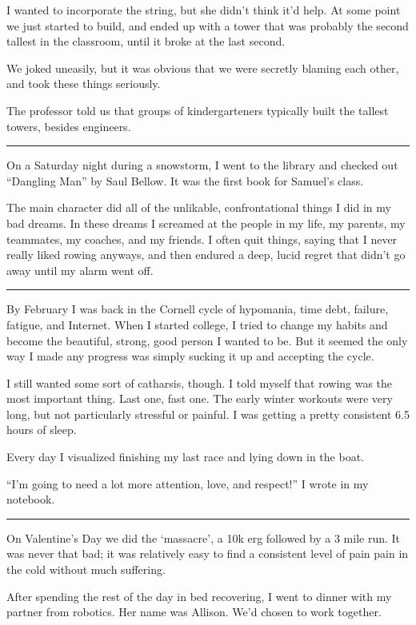 I wanted to incorporate the string, but she didn't think it'd help.  At some
point we just started to build, and ended up with a tower that was probably the
second tallest in the classroom, until it broke at the last second.

We joked uneasily, but it was obvious that we were secretly blaming each other,
and took these things seriously.

The professor told us that groups of kindergarteners typically built the tallest
towers, besides engineers.

\plainfancybreak{12pt}{2}{* * *}

On a Saturday night during a snowstorm, I went to the library and checked out
``Dangling Man'' by Saul Bellow.  It was the first book for Samuel's class.

The main character did all of the unlikable, confrontational things I did in my
bad dreams.  In these dreams I screamed at the people in my life, my parents, my
teammates, my coaches, and my friends.  I often quit things, saying that I never
really liked rowing anyways, and then endured a deep, lucid regret that didn't
go away until my alarm went off.

\plainfancybreak{12pt}{2}{* * *}

By February I was back in the Cornell cycle of hypomania, time debt, failure,
fatigue, and Internet.  When I started college, I tried to change my habits and
become the beautiful, strong, good person I wanted to be.  But it seemed the
only way I made any progress was simply sucking it up and accepting the cycle.

I still wanted some sort of catharsis, though.  I told myself that rowing was
the most important thing.  Last one, fast one.  The early winter workouts were
very long, but not particularly stressful or painful.  I was getting a pretty
consistent 6.5 hours of sleep.

Every day I visualized finishing my last race and lying down in the boat.

``I'm going to need a lot more attention, love, and respect!'' I wrote in my
notebook. 

\plainfancybreak{12pt}{2}{* * *}

On Valentine's Day we did the `massacre', a 10k erg followed by a 3 mile run.
It was never that bad; it was relatively easy to find a consistent level of pain
pain in the cold without much suffering.  

After spending the rest of the day in bed recovering, I went to dinner with my
partner from robotics.  Her name was Allison.  We'd chosen to work together.  


